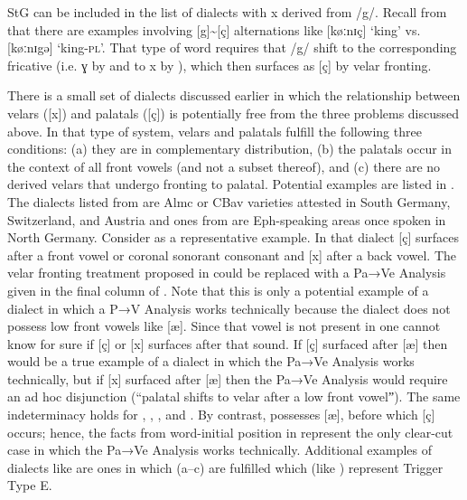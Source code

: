 StG can be included in the list of dialects with {\textbar}x{\textbar} derived from /g/. Recall from  that there are examples involving [g]{\textasciitilde}[ç] alternations like [køːnɪç] ‘king’ vs. [køːnɪgə] ‘king-\textsc{pl}’. That type of word requires that /g/ shift to the corresponding fricative (i.e. {\textbar}ɣ{\textbar} by  and to {\textbar}x{\textbar} by ), which then surfaces as [ç] by velar fronting.

There is a small set of dialects discussed earlier in which the relationship between velars ([x]) and palatals ([ç]) is potentially free from the three problems discussed above. In that type of system, velars and palatals fulfill the following three conditions: (a) they are in complementary distribution, (b) the palatals occur in the context of all front vowels (and not a subset thereof), and (c) there are no derived velars that undergo fronting to palatal. Potential examples are listed in . The dialects listed from  are Almc or CBav varieties attested in South Germany, Switzerland, and Austria and ones from  are Eph-speaking areas once spoken in North Germany. Consider  as a representative example. In that dialect [ç] surfaces after a front vowel or coronal sonorant consonant and [x] after a back vowel. The velar fronting treatment proposed in  could be replaced with a Pa→Ve Analysis given in the final column of . Note that this is only a potential example of a dialect in which a P→V Analysis works technically because the dialect does not possess low front vowels like [æ]. Since that vowel is not present in  one cannot know for sure if [ç] or [x] surfaces after that sound. If [ç] surfaced after [æ] then  would be a true example of a dialect in which the Pa→Ve Analysis works technically, but if [x] surfaced after [æ] then the Pa→Ve Analysis would require an ad hoc disjunction (“palatal shifts to velar after a low front vowelˮ). The same indeterminacy holds for , , , and . By contrast,  possesses [æ], before which [ç] occurs; hence, the facts from word-initial position in  represent the only clear-cut case in which the Pa→Ve Analysis works technically. Additional examples of dialects like  are ones in which (a--c) are fulfilled which (like ) represent Trigger Type E.

